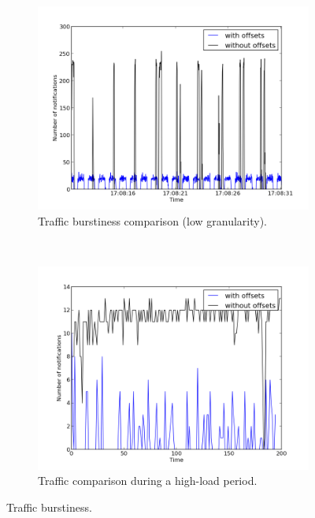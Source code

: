 \begin{figure}
\centering
\begin{subfigure}[ht]{0.45\textwidth}
\centering
\includegraphics[width=\textwidth]{Images/burstiness.png}
\caption{Traffic burstiness comparison (low granularity).}
\label{fig:burstiness}
\end{subfigure}
~
\begin{subfigure}[ht]{0.45\textwidth}
\centering
\includegraphics[width=\textwidth]{Images/burstiness_hires.png}
\caption{Traffic  comparison during a high-load period.}
\label{fig:burstiness_hires}
\end{subfigure}
\label{fig:burstiness_both}
\caption{Traffic burstiness.}
\end{figure}

